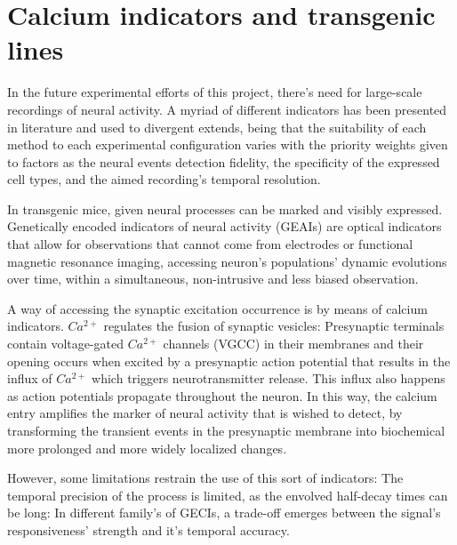 \section{Calcium indicators and transgenic lines}
\label{sec:sectionb}


In the future experimental efforts of this project, there's need for large-scale recordings of neural activity. A myriad of different indicators has been presented in literature and used to divergent extends, being that the suitability of each method to each experimental configuration varies with the priority weights given to factors as the neural events detection fidelity, the specificity of the expressed cell types, and the aimed recording's temporal resolution.

In transgenic mice, given neural processes can be marked and visibly expressed. Genetically encoded indicators of neural activity (GEAIs) are optical indicators that allow for observations that cannot come from electrodes or functional magnetic resonance imaging, accessing neuron's populations' dynamic evolutions over time, within a simultaneous, non-intrusive and less biased observation.


A way of accessing the synaptic excitation occurrence is by means of calcium indicators. $Ca^{2+}$ regulates the fusion of synaptic vesicles: Presynaptic terminals contain voltage-gated $Ca^{2+}$ channels (VGCC) in their membranes and their opening occurs when excited by a presynaptic action potential that results in the influx of $Ca^{2+}$ which triggers neurotransmitter release. This influx also happens as action potentials propagate throughout the neuron. In this way, the calcium entry amplifies the marker of neural activity that is wished to detect, by transforming the transient events in the presynaptic membrane into biochemical more prolonged and more widely localized changes.

However, some limitations restrain the use of this sort of indicators: The temporal precision of the process is limited, as the envolved half-decay times can be long: In different family's of GECIs, a trade-off emerges between the signal's responsiveness' strength and it's temporal accuracy.

